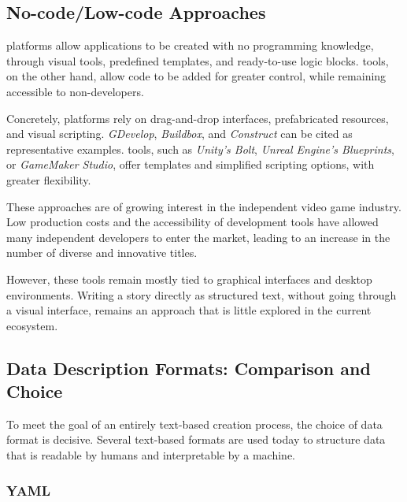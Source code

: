 \clearpage


\subsection{No-code/Low-code Approaches}

\textit{} platforms allow applications to be created with no programming knowledge, through visual tools, predefined templates, and ready-to-use logic blocks. \textit{} tools, on the other hand, allow code to be added for greater control, while remaining accessible to non-developers.

Concretely, \textit{} platforms rely on drag-and-drop interfaces, prefabricated resources, and visual scripting. \textit{GDevelop}, \textit{Buildbox}, and \textit{Construct} can be cited as representative examples. \textit{} tools, such as \textit{Unity's Bolt}, \textit{Unreal Engine's Blueprints}, or \textit{GameMaker Studio}, offer templates and simplified scripting options, with greater flexibility. \parencite{labs_rise_2024}

These approaches are of growing interest in the independent video game industry. Low production costs and the accessibility of development tools have allowed many independent developers to enter the market, leading to an increase in the number of diverse and innovative titles. \parencite{noauthor_visual_nodate}

However, these tools remain mostly tied to graphical interfaces and desktop environments. Writing a story directly as structured text, without going through a visual interface, remains an approach that is little explored in the current ecosystem.



\subsection{Data Description Formats: Comparison and Choice}

To meet the goal of an entirely text-based creation process, the choice of data format is decisive. Several text-based formats are used today to structure data that is readable by humans and interpretable by a machine.


\subsubsection{YAML}

